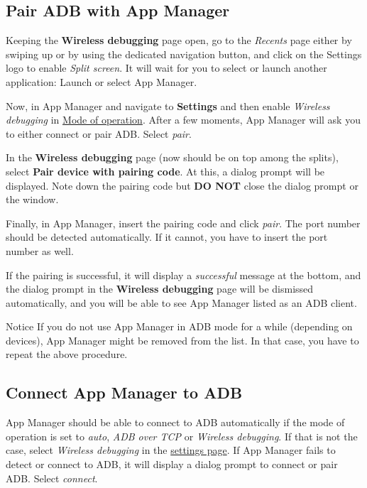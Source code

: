 \subsection{Pair ADB with App Manager}\label{subsec:pair-adb-with-app-manager} %
Keeping the \textbf{Wireless debugging} page open, go to the \textit{Recents} page either by swiping up or by using the dedicated navigation button,
and click on the Settings logo to enable \textit{Split screen}. It will wait for you to select or launch another application:
Launch or select App Manager.

Now, in App Manager and navigate to \textbf{Settings} and then enable \textit{Wireless debugging} in \hyperref[subsec:mode-of-operation]{Mode of operation}.
After a few moments, App Manager will ask you to either connect or pair ADB\@. Select \textit{pair}.

In the \textbf{Wireless debugging} page (now should be on top among the splits), select \textbf{Pair device with pairing code}.
At this, a dialog prompt will be displayed. Note down the pairing code but \textbf{DO NOT} close the dialog prompt or the window.

Finally, in App Manager, insert the pairing code and click \textit{pair}. The port number should be detected automatically.
If it cannot, you have to insert the port number as well.

If the pairing is successful, it will display a \textit{successful} message at the bottom, and the dialog prompt in the \textbf{Wireless debugging} page will be dismissed automatically,
and you will be able to see App Manager listed as an ADB client.

\begin{tip}{Notice}
    If you do not use App Manager in ADB mode for a while (depending on devices), App Manager might be removed from the list.
    In that case, you have to repeat the above procedure.
\end{tip}

\subsection{Connect App Manager to ADB}\label{subsec:connect-app-manager-to-adb} %
App Manager should be able to connect to ADB automatically if the mode of operation is set to \textit{auto}, \textit{ADB over TCP} or \textit{Wireless debugging}.
If that is not the case, select \textit{Wireless debugging} in the \hyperref[subsec:mode-of-operation]{settings page}.
If App Manager fails to detect or connect to ADB, it will display a dialog prompt to connect or pair ADB. Select \textit{connect}.


